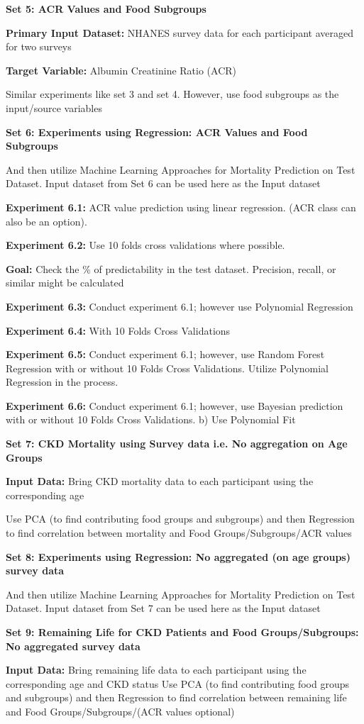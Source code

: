 \noindent \textbf{Set 5: ACR Values and Food Subgroups}

\noindent \textbf{Primary Input Dataset:} NHANES survey data for each participant averaged for  two surveys

\noindent \textbf{Target Variable:} Albumin Creatinine Ratio (ACR)

\noindent Similar experiments like set 3 and set 4. However, use food subgroups as the input/source variables


\noindent \textbf{Set 6: Experiments using Regression: ACR Values and Food Subgroups}

\noindent And then utilize Machine Learning Approaches for Mortality Prediction on Test Dataset. Input dataset from Set 6 can be used here as the Input dataset

\noindent \textbf{Experiment 6.1:}  ACR value prediction using linear regression. (ACR class can also be an option). 

\noindent \textbf{Experiment 6.2:} Use 10 folds cross validations where possible.

\noindent \textbf{Goal:} Check the \% of predictability in the test dataset. Precision, recall, or similar might be calculated

\noindent \textbf{Experiment 6.3:} Conduct experiment 6.1; however use Polynomial Regression 

\noindent \textbf{Experiment 6.4:} With 10 Folds Cross Validations  

\noindent \textbf{Experiment 6.5:} Conduct experiment 6.1; however, use Random Forest Regression with or without 10 Folds Cross Validations. Utilize Polynomial Regression in the process.

\noindent \textbf{Experiment 6.6:} Conduct experiment 6.1; however, use Bayesian prediction with or without 10 Folds Cross Validations.  b) Use Polynomial Fit

\noindent \textbf{Set 7: CKD Mortality using Survey data i.e. No aggregation on Age Groups}

\noindent \textbf{Input Data:} Bring CKD mortality data to each participant using the corresponding age

\noindent Use PCA (to find contributing food groups and subgroups) and then Regression to find correlation between mortality and Food Groups/Subgroups/ACR values

\noindent \textbf{Set 8: Experiments using Regression: No aggregated (on age groups) survey data} 

\noindent And then utilize Machine Learning Approaches for Mortality Prediction on Test Dataset. Input dataset from Set 7 can be used here as the Input dataset

\noindent \textbf{Set 9: Remaining Life for CKD Patients and Food Groups/Subgroups: No aggregated survey data}

\noindent \textbf{Input Data:} Bring remaining life data to each participant using the corresponding age and CKD status
Use PCA (to find contributing food groups and subgroups) and then Regression to find correlation between remaining life  and Food Groups/Subgroups/(ACR values optional)